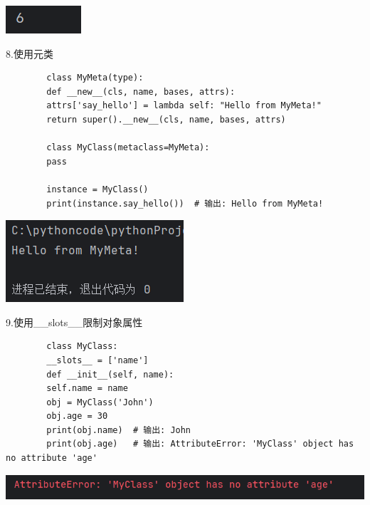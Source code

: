 \documentclass{article}
\begin{document}
	\noindent
	\begin{minipage}{\linewidth}
		\centering
		\includegraphics[width=0.5\linewidth]{example10.png}
		\label{fig:example}
	\end{minipage}
	
	8.使用元类
	\begin{verbatim}
		class MyMeta(type):  
		def __new__(cls, name, bases, attrs):  
		attrs['say_hello'] = lambda self: "Hello from MyMeta!"  
		return super().__new__(cls, name, bases, attrs)  
		
		class MyClass(metaclass=MyMeta):  
		pass  
		
		instance = MyClass()  
		print(instance.say_hello())  # 输出: Hello from MyMeta!
	\end{verbatim}
	
	\noindent
	\begin{minipage}{\linewidth}
		\centering
		\includegraphics[width=0.5\linewidth]{example11.png}
		\label{fig:example}
	\end{minipage}
	
	9.使用\_\_slots\_\_限制对象属性
	\begin{verbatim}
		class MyClass:
		__slots__ = ['name']
		def __init__(self, name):
		self.name = name
		obj = MyClass('John')
		obj.age = 30  
		print(obj.name)  # 输出: John
		print(obj.age)   # 输出: AttributeError: 'MyClass' object has no attribute 'age'
	\end{verbatim}
	
	\noindent
	\begin{minipage}{\linewidth}
		\centering
		\includegraphics[width=0.5\linewidth]{example12.png}
		\label{fig:example}
	\end{minipage}
	
\end{document}
